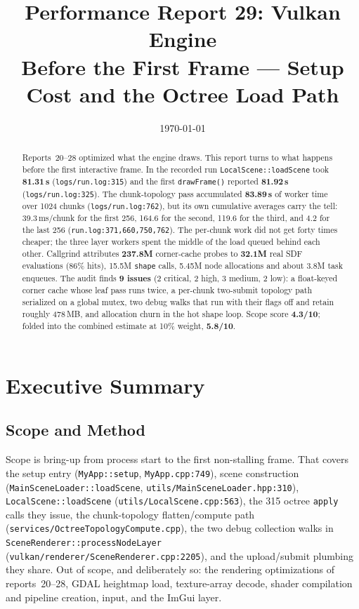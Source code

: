 \documentclass[11pt,a4paper]{article}
\title{Performance Report 29: Vulkan Engine \\
\large Before the First Frame --- Setup Cost and the Octree Load Path}
\author{}
\date{\today}
\begin{document}
\maketitle

\begin{abstract}
Reports~20--28 optimized what the engine draws. This report turns to what
happens before the first interactive frame. In the recorded run
\texttt{LocalScene::loadScene} took \textbf{81.31\,s}
(\texttt{logs/run.log:315}) and the first \texttt{drawFrame()} reported
\textbf{81.92\,s} (\texttt{logs/run.log:325}). The chunk-topology pass
accumulated \textbf{83.89\,s} of worker time over 1024 chunks
(\texttt{logs/run.log:762}), but its own cumulative averages carry the tell:
39.3\,ms/chunk for the first 256, 164.6 for the second, 119.6 for the third,
and 4.2 for the last 256 (\texttt{run.log:371,660,750,762}). The per-chunk
work did not get forty times cheaper; the three layer workers spent the middle
of the load queued behind each other. Callgrind attributes \textbf{237.8M}
corner-cache probes to \textbf{32.1M} real SDF evaluations (86\% hits),
15.5M \texttt{shape} calls, 5.45M node allocations and about 3.8M task
enqueues. The audit finds \textbf{9 issues} (2 critical, 2 high, 3 medium,
2 low): a float-keyed corner cache whose leaf pass runs twice, a per-chunk
two-submit topology path serialized on a global mutex, two debug walks that
run with their flags off and retain roughly 478\,MB, and allocation churn in
the hot shape loop. Scope score \textbf{4.3/10}; folded into the combined
estimate at 10\% weight, \textbf{5.8/10}.
\end{abstract}

\tableofcontents
\newpage

\section{Executive Summary}

\subsection{Scope and Method}

Scope is bring-up from process start to the first non-stalling frame. That
covers the setup entry (\texttt{MyApp::setup}, \texttt{MyApp.cpp:749}), scene construction
(\texttt{MainSceneLoader::loadScene}, \texttt{utils/MainSceneLoader.hpp:310}),
\texttt{LocalScene::loadScene} (\texttt{utils/LocalScene.cpp:563}), the 315
octree \texttt{apply} calls they issue, the chunk-topology flatten/compute
path (\texttt{services/OctreeTopologyCompute.cpp}), the two debug collection
walks in \texttt{SceneRenderer::processNodeLayer}
(\texttt{vulkan/renderer/SceneRenderer.cpp:2205}), and the upload/submit
plumbing they share. Out of scope, and deliberately so: the rendering
optimizations of reports~20--28, GDAL heightmap load, texture-array decode,
shader compilation and pipeline creation, input, and the ImGui layer.
\end{document}

